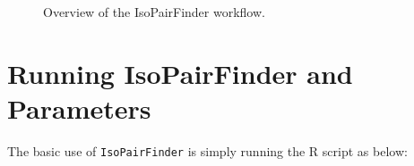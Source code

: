 \documentclass[
  letterpaper,
  DIV=11,
  numbers=noendperiod]{scrreprt}
\begin{document}
\begin{figure}


\caption{\label{fig-figure3-1}Overview of the IsoPairFinder workflow.}

\end{figure}%

\section{Running IsoPairFinder and
Parameters}\label{sec-isoPairFinder-parameters}

The basic use of \texttt{IsoPairFinder} is simply running the R script
as below:
\end{document}
